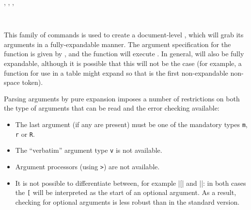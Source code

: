 \documentclass{l3doc}
\begin{document}
\begin{function}
  {
    \NewExpandableDocumentCommand     ,
    \RenewExpandableDocumentCommand   ,
    \ProvideExpandableDocumentCommand ,
    \DeclareExpandableDocumentCommand
  }
  \begin{syntax}
    ~~~~  
  \end{syntax}
  This family of commands is used to create a document-level ,
  which will grab its arguments in a fully-expandable manner. The
  argument specification for the function is given by ,
  and the function will execute . In  general,  will
  also be fully expandable, although it is possible that this will
  not be the case (for example, a function for use in a table might
  expand so that  is the first non-expandable non-space token).

  Parsing arguments by pure expansion imposes a number of restrictions on
  both the type of arguments that can be read and the error checking
  available:
  \begin{itemize}
    \item The last argument (if any are present) must be one of the
      mandatory types \texttt{m}, \texttt{r} or \texttt{R}.
    \item The \enquote{verbatim} argument type \texttt{v} is not available.
    \item Argument processors (using \texttt{>}) are not available.
    \item It is not possible to differentiate between, for example
      |\foo[| and |\foo{[}|: in both cases the \texttt{[} will be
      interpreted as the start of an optional argument. As a
      result, checking for optional arguments is less robust than
      in the standard version.
  \end{itemize}
\end{function}
\end{document}
